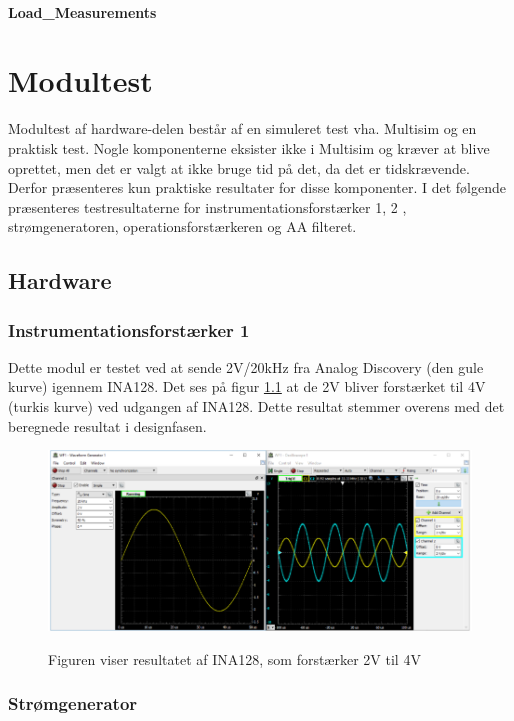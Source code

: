 \subsubsection{Load\_Measurements} 


\chapter{Modultest}
Modultest af hardware-delen består af en simuleret test vha. Multisim og en praktisk test. Nogle komponenterne eksister ikke i Multisim og kræver at blive oprettet, men det er valgt at ikke bruge tid på det, da det er tidskrævende. Derfor præsenteres kun praktiske resultater for disse komponenter. I det følgende præsenteres testresultaterne for instrumentationsforstærker 1, 2 , strømgeneratoren, operationsforstærkeren og AA filteret. 

\section{Hardware}

\subsection{Instrumentationsforstærker 1}
Dette modul er testet ved at sende 2V/20kHz fra Analog Discovery (den gule kurve) igennem INA128. Det ses på figur \ref{TestINA} at de 2V bliver forstærket til 4V (turkis kurve) ved udgangen af INA128. Dette resultat stemmer overens med det beregnede resultat i designfasen.    

\begin{figure}[H] 
\centering
{\includegraphics[width=\linewidth]
{Figure/TestINA1281}}
\caption{Figuren viser resultatet af INA128, som forstærker 2V til 4V}
\label{TestINA}
\end{figure}
  \pagebreak
\subsection{Strømgenerator}

